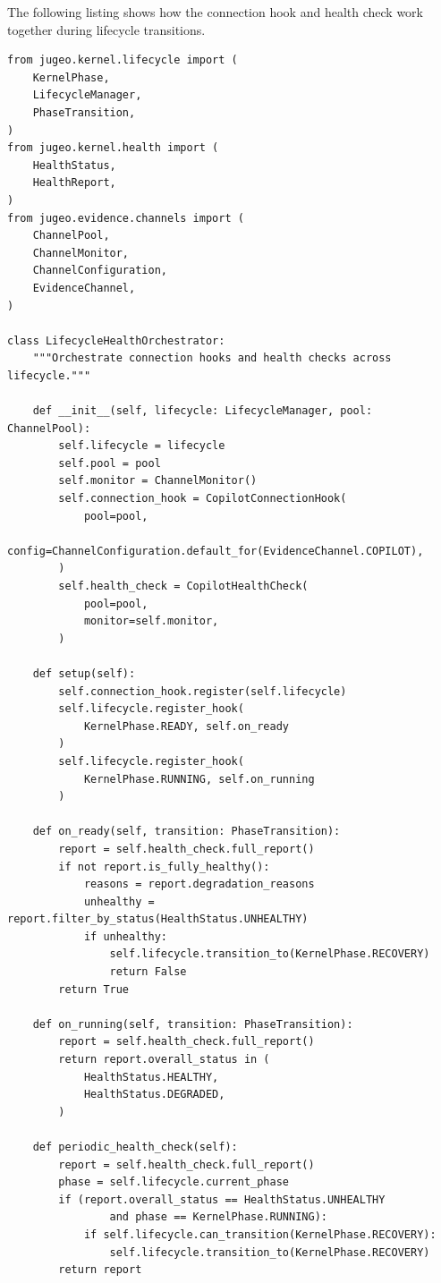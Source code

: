 \documentclass[11pt]{article}
\begin{document}
The following listing shows how the connection hook and
health check work together during lifecycle transitions.

\begin{lstlisting}[style=jugeo-python,
  caption={Lifecycle-integrated health monitoring},
  label={lst:lifecyclehealth}]
from jugeo.kernel.lifecycle import (
    KernelPhase,
    LifecycleManager,
    PhaseTransition,
)
from jugeo.kernel.health import (
    HealthStatus,
    HealthReport,
)
from jugeo.evidence.channels import (
    ChannelPool,
    ChannelMonitor,
    ChannelConfiguration,
    EvidenceChannel,
)

class LifecycleHealthOrchestrator:
    """Orchestrate connection hooks and health checks across lifecycle."""

    def __init__(self, lifecycle: LifecycleManager, pool: ChannelPool):
        self.lifecycle = lifecycle
        self.pool = pool
        self.monitor = ChannelMonitor()
        self.connection_hook = CopilotConnectionHook(
            pool=pool,
            config=ChannelConfiguration.default_for(EvidenceChannel.COPILOT),
        )
        self.health_check = CopilotHealthCheck(
            pool=pool,
            monitor=self.monitor,
        )

    def setup(self):
        self.connection_hook.register(self.lifecycle)
        self.lifecycle.register_hook(
            KernelPhase.READY, self.on_ready
        )
        self.lifecycle.register_hook(
            KernelPhase.RUNNING, self.on_running
        )

    def on_ready(self, transition: PhaseTransition):
        report = self.health_check.full_report()
        if not report.is_fully_healthy():
            reasons = report.degradation_reasons
            unhealthy = report.filter_by_status(HealthStatus.UNHEALTHY)
            if unhealthy:
                self.lifecycle.transition_to(KernelPhase.RECOVERY)
                return False
        return True

    def on_running(self, transition: PhaseTransition):
        report = self.health_check.full_report()
        return report.overall_status in (
            HealthStatus.HEALTHY,
            HealthStatus.DEGRADED,
        )

    def periodic_health_check(self):
        report = self.health_check.full_report()
        phase = self.lifecycle.current_phase
        if (report.overall_status == HealthStatus.UNHEALTHY
                and phase == KernelPhase.RUNNING):
            if self.lifecycle.can_transition(KernelPhase.RECOVERY):
                self.lifecycle.transition_to(KernelPhase.RECOVERY)
        return report


\end{lstlisting}
\end{document}
